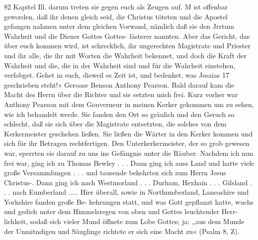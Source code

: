 82 Kapitel Ill.
darum treten sie gegen euch als Zeugen auf. M ist offenbar
geworden, daß ihr denen gleich seid, die Christus töteten und die
Apostel gefangen nahmen unter dem gleichen Vorwand, nämlich
daß sie den Jrrtum Wahrheit und die Diener Gottes Gottes-
lästerer nannten. Aber das Gericht, das über euch kommen wird,
ist schrecklich, ihr ungerechten Magistrate und Priester und ihr
alle, die ihr mit Worten die Wahrheit bekennet, und doch die
Kraft der Wahrheit und die, die in der Wahrheit sind und für die
Wahrheit einstehen, verfobget. Gehet in euch, dieweil es Zeit
ist, und bedenket, was Jesaias 17 geschrieben steht!«
Geroase Benson
Anthony Pearson.
Bald darauf kam die Macht des Herrn über die Richter
und sie setzten mich frei. Kurz vorher war Anthony Pearson
mit dem Gouverneur in meinen Kerker gekommen um zu sehen,
wie ich behandelt werde. Sie fanden den Ort so gräulich und
den Geruch so schlecht, daß sie sich über die Magistrate entsetzten,
die solches von dem Kerkermeister geschehen ließen. Sie ließen
die Wärter in den Kerker kommen und sich für ihr Betragen
rechtfertigen. Den Unterkerkermeister, der so grob gewesen war,
sperrten sie darauf zu uns ins Gefängnis unter die Räuber.
Nachdem ich nun frei war, ging ich zu Thomas Bewley . . .
Dann ging ich auss Land und hatte viele große Versammlungen . . .
und tausende bekehrten sich zum Herrn Jesus Christus-.
Dann ging ich nach Westmorland . . . Durham, Hexhain . . .
Gilsland . . . nach Eumberland ..... Hier überall, sowie in
Northumberland, Laneashire und Yorkshire fanden große Be-
kehrungen statt, und was Gott gepflanzt hatte, wuchs und gedieh
unter dem Himmelsregen von oben und Gottes leuchtender Herr-
lichkeit, sodaß sich vieler Mund öffnete zum Lobe Gottes; ja: ,,aus
dem Munde der Unmitndigen und Säuglinge richtete er sich eine
Macht zu« (Psalm 8, Z).


